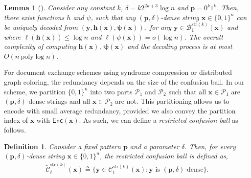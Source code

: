 \documentclass[onecolumn]{IEEEtran}
\newtheorem{lemma}{Lemma}
\newtheorem{definition}{Definition}
\newcommand{\bl}{n}
\newcommand{\numedits}{t}
\newcommand{\editsize}{k}
\newcommand{\confball}[3]{\mathcal{C}_{#1}^{#2}(#3)}
\newcommand{\resconfball}[3]{\tilde{\mathcal{C}}_{#1}^{#2}(#3)}
\newcommand{\editball}[3]{\mathcal{B}_{#1}^{#2}(#3)}
\newcommand{\length}[1]{{\ell}(#1)}
\newcommand{\encode}{\mathsf{Enc}}
\newcommand{\defeq}{\ensuremath{\triangleq}}
\newcommand{\bfp}{{\mathbf{ p}}}
\newcommand{\bfx}{{\mathbf{ x}}}
\newcommand{\bfy}{{\mathbf{ y}}}
\newcommand{\bfX}{{\mathbf{ X}}}
\newcommand{\cP}{\mathcal{P}}
\newcommand{\vr}[1]{{\color{red} {\small [VR: #1]} }}
\begin{document}
\begin{lemma}[{\protect\cite[Theorem~19]{Li_Optimal_one_substring_error}}]
\label{lem: substring edit code}
Consider any constant $\editsize$, $\delta = \editsize2^{2\editsize+3}\log\bl$ and $\bfp=0^\editsize1^\editsize$. Then, there exist functions $h$ and $\psi$, such that any $(\mathbf{p}, \delta)$-dense string  $\mathbf{x} \in\{0,1\}^\bl$ can be uniquely decoded from
   $ (\bfy, \mathbf{h(\mathbf{x})}, \mathbf{\psi(\mathbf{x})}),$
for any  $\mathbf{y} \in \editball{1}{\mathrm{str}(\editsize)}{\mathbf{x}}$ and where $\length{\mathbf{h(\mathbf{x})}}\leq \log\bl$ and $\length{\psi(\mathbf{x}}) = o(\log\bl)$. The overall complexity of computing $\mathbf{h(\mathbf{x})}$, $\mathbf{\psi(\mathbf{x})}$ and the decoding process is at most $O(\bl \ \mathrm{ poly }\log \bl)$.
\end{lemma}
For document exchange schemes using syndrome compression or distributed graph coloring, the redundancy depends on the size of the confusion ball. In our scheme, we partition $\{0,1\}^n$ into two parts $\cP_1$ and $\cP_2$ such that all $\bfx \in \cP_1$ are $(\bfp,\delta)$-dense strings and all $\bfx\in \cP_2$ are not. This partitioning allows us to encode with small average redundancy, provided we also convey the partition index of $\bfx$ with $\encode(\bfx)$. As such, we can define a \emph{restricted confusion ball} as follows.


\begin{definition}
    Consider a fixed pattern $\mathbf{p}$ and a parameter $\delta$. Then, for every $(\mathbf{p}, \delta)$-dense string $\mathbf{x} \in \{0,1\}^\bl$, the \emph{restricted confusion ball} is defined as,
    \begin{align*}
       \resconfball{\numedits}{\mathrm{str}(\editsize)}{\bfx} \defeq \{\bfy \in \confball{\numedits}{\mathrm{str}(\editsize)}{\bfx}: \bfy \text{ is } (\mathbf{p}, \delta)\text{-dense}\}.
    \end{align*}
\end{definition}
\end{document}
